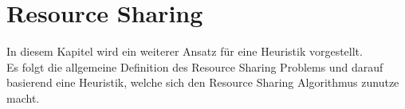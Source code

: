 \documentclass[11pt, a4paper, german]{article}
\newcommand{\TM}{Technology  Mapping }
\begin{document}

\section{Resource Sharing}\label{sec:resource_sh}
In diesem Kapitel wird ein weiterer Ansatz für eine Heuristik vorgestellt.\\
Es folgt die allgemeine Definition des Resource Sharing Problems und darauf basierend eine Heuristik, welche sich den Resource Sharing Algorithmus zunutze macht.\\
\end{document}
